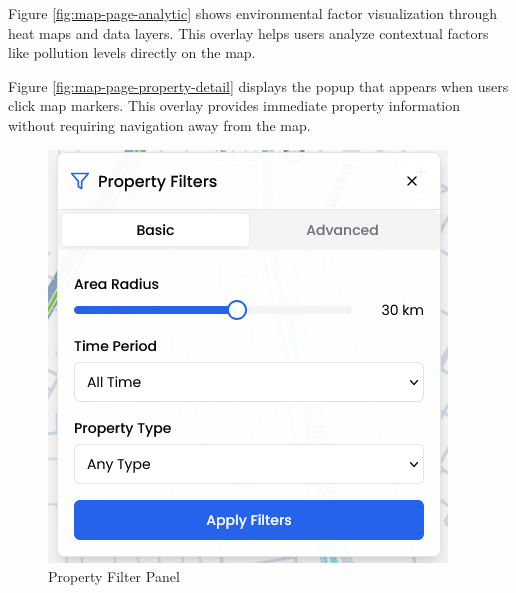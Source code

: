 \pagebreak
Figure \ref{fig:map-page-analytic} shows environmental factor visualization through heat maps and data layers. This overlay helps users analyze contextual factors like pollution levels directly on the map.

Figure \ref{fig:map-page-property-detail} displays the popup that appears when users click map markers. This overlay provides immediate property information without requiring navigation away from the map.

\begin{figure}[h]
\centering
\begin{minipage}[b]{0.45\textwidth}
\centering
\includegraphics[width=\textwidth]{assets/ui/map-page-property-filter.png}
\caption{Property Filter Panel}
\label{fig:map-page-property-filter}
\end{minipage}
\hspace{0.05\textwidth}
\begin{minipage}[b]{0.45\textwidth}
\centering

\end{minipage}
\end{figure}
